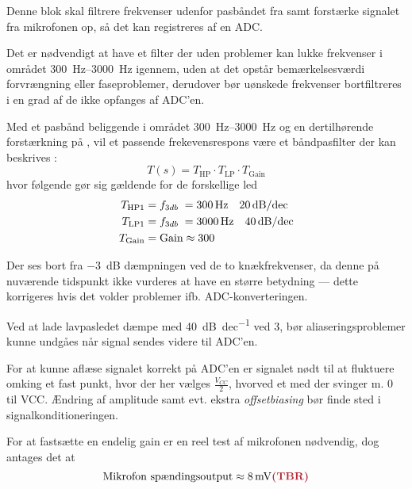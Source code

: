 Denne blok skal filtrere frekvenser udenfor pasbåndet fra samt forstærke signalet fra mikrofonen op, så det kan registreres af en ADC.

Det er nødvendigt at have et filter der uden problemer kan lukke frekvenser i området \SIrange{300}{3000}{Hz} igennem, uden at det opstår bemærkelsesværdi forvrængning eller faseproblemer, derudover bør uønskede frekvenser bortfiltreres i en grad af de ikke opfanges af ADC'en.

Med et pasbånd beliggende i området \SIrange{300}{3000}{Hz} og en dertilhørende forstærkning på , vil et passende frekevensrespons være et båndpasfilter der kan beskrives : 
\begin{equation}
    T(s) = T_{\textrm{HP}} \cdot T_{\textrm{LP}} \cdot T_{\textrm{Gain}} 
\end{equation}
hvor følgende gør sig gældende for de forskellige led
\begin{equation}
    \begin{split}
        T_{\textrm{HP1}} &= \fdb = \SI{300}{Hz} \quad \SI{20}{\dB\per dec} \\
        T_{\textrm{LP1}} &= \fdb = \SI{3000}{Hz} \quad  \SI{40}{\dB\per dec} \\
        T_{\textrm{Gain}} &= \textrm{Gain} \approx  300
    \end{split}
\end{equation}


Der ses bort fra \SI{-3}{\dB} dæmpningen ved de to knækfrekvenser, da denne på nuværende tidspunkt ikke vurderes at have en større betydning --- dette korrigeres hvis det volder problemer ifb. ADC-konverteringen.

Ved at lade lavpasledet dæmpe med \SI{40}{\dB\per dec} ved 3\kHz, bør aliaseringsproblemer kunne undgåes når signal sendes videre til ADC'en.

For at kunne aflæse signalet korrekt på ADC'en er signalet nødt til at fluktuere omking et fast punkt, hvor der her vælges \(\frac{V_{CC}}{2}\), hvorved et med der svinger m. 0 til VCC. 
Ændring af amplitude samt evt. ekstra \emph{offsetbiasing} bør finde sted i signalkonditioneringen.

For at fastsætte en endelig gain er en reel test af mikrofonen nødvendig, dog antages det at 
\begin{equation}
    \textrm{Mikrofon spændingsoutput}\approx \SI{8}{mV} \tbr
\end{equation}

